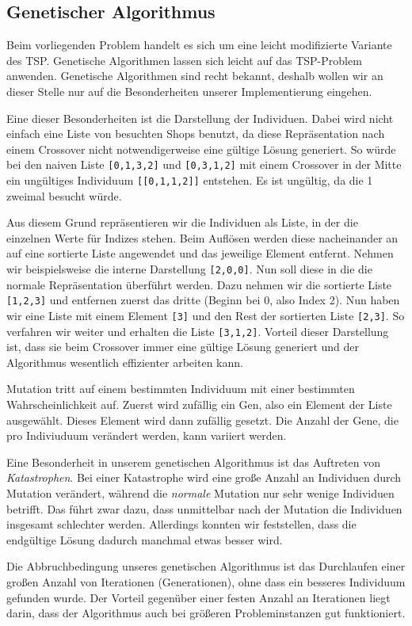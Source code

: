 \subsection{Genetischer Algorithmus}

Beim vorliegenden Problem handelt es sich um eine leicht modifizierte Variante des TSP. Genetische Algorithmen lassen sich leicht auf das TSP-Problem anwenden. Genetische Algorithmen sind recht bekannt, deshalb wollen wir an dieser Stelle nur auf die Besonderheiten unserer Implementierung eingehen.

Eine dieser Besonderheiten ist die Darstellung der Individuen. Dabei wird nicht einfach eine Liste von besuchten Shops benutzt, da diese Repräsentation nach einem Crossover nicht notwendigerweise eine gültige Lösung generiert. So würde bei den naiven Liste \texttt{[0,1,3,2]} und \texttt{[0,3,1,2]} mit einem Crossover in der Mitte ein ungültiges Individuum \texttt{[[0,1,1,2]]} entstehen. Es ist ungültig, da die 1 zweimal besucht würde. 

Aus diesem Grund repräsentieren wir die Individuen als Liste, in der die einzelnen Werte für Indizes stehen. Beim Auflösen werden diese nacheinander an auf eine sortierte Liste angewendet und das jeweilige Element entfernt. Nehmen wir beispielsweise die interne Darstellung \texttt{[2,0,0]}. Nun soll diese in die die normale Repräsentation überführt werden. Dazu nehmen wir die sortierte Liste \texttt{[1,2,3]} und entfernen zuerst das dritte (Beginn bei 0, also Index 2). Nun haben wir eine Liste mit einem Element \texttt{[3]} und den Rest der sortierten Liste \texttt{[2,3]}. So verfahren wir weiter und erhalten die Liste \texttt{[3,1,2]}. Vorteil dieser Darstellung ist, dass sie beim Crossover immer eine gültige Lösung generiert und der Algorithmus wesentlich effizienter arbeiten kann.

Mutation tritt auf einem bestimmten Individuum mit einer bestimmten Wahrscheinlichkeit auf. Zuerst wird zufällig ein Gen, also ein Element der Liste ausgewählt. Dieses Element wird dann zufällig gesetzt. Die Anzahl der Gene, die pro Indiviuduum verändert werden, kann variiert werden. 

Eine Besonderheit in unserem genetischen Algorithmus ist das Auftreten von \emph{Katastrophen}. Bei einer Katastrophe wird eine große Anzahl an Individuen durch Mutation verändert, während die \emph{normale} Mutation nur sehr wenige Individuen betrifft. Das führt zwar dazu, dass unmittelbar nach der Mutation die Individuen insgesamt schlechter werden. Allerdings konnten wir feststellen, dass die endgültige Lösung dadurch manchmal etwas besser wird. 

Die Abbruchbedingung unseres genetischen Algorithmus ist das Durchlaufen einer großen Anzahl von Iterationen (Generationen), ohne dass ein besseres Individuum gefunden wurde. Der Vorteil gegenüber einer festen Anzahl an Iterationen liegt darin, dass der Algorithmus auch bei größeren Probleminstanzen gut funktioniert.

